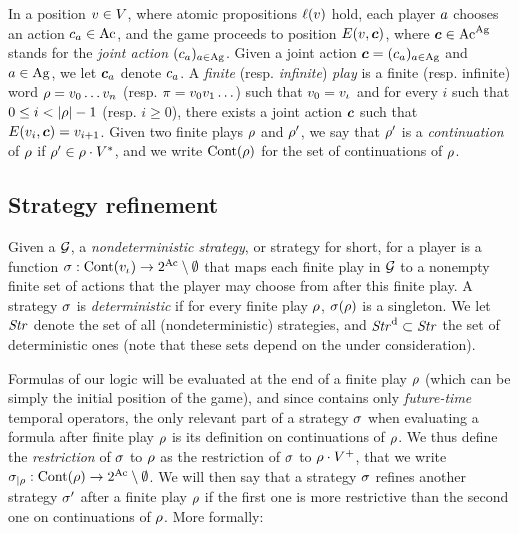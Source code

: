 
In a position $v\in V$, where atomic propositions $\ell(v)$
hold, each player $a$ chooses an action $c_a\in\textnormal{Ac}$, 
and the game proceeds to position
$E(v, \bm{c})$, where $\bm{c}\in \textnormal{Ac}^{\textnormal{Ag}}$ stands for the \emph{joint action}
$(c_a)_{a\in\textnormal{Ag}}$. Given a joint action
$\bm{c}=(c_a)_{a\in\textnormal{Ag}}$ and $a\in\textnormal{Ag}$, we let
$\bm{c}_{a}$ denote $c_a$.
A \emph{finite} (resp. \emph{infinite}) \emph{play} is a finite (resp. infinite)
word $\rho=v_{0}\ldots v_{n}$ (resp. $\pi=v_{0} v_{1}\ldots$)
such that $v_0=v_{\iota}$ and for every $i$ such that $0\leq i<|\fplay|-1$ (resp. $i\geq 0$), there exists a joint action $\bm{c}$
such that $E(v_{i}, \bm{c})=v_{i+1}$.
Given two finite plays $\rho$ and $\rho'$, we say that $\rho'$
is a \emph{continuation} of $\rho$ if $\rho'\in\rho\cdot
V^*$, and we write $\text{Cont}(\rho)$ for the set of
continuations of $\rho$.


\subsection{Strategy refinement}
\label{sec-ndstrat}
Given a \CGS $\CGS$, a \emph{nondeterministic strategy}, or strategy
for short, for a player is a
function $\sigma:\text{Cont}(v_{\iota})\to 2^{\textnormal{Ac}}\setminus\emptyset$
that maps each finite play in $\CGS$ to a nonempty finite set of
actions that the player may choose from after this finite play.  A strategy $\sigma$ is
\emph{deterministic} if for every finite play $\rho$,
$\sigma(\rho)$ is a singleton.  We let $\mbox{\emph{Str}}$ denote the set of
all (nondeterministic) strategies, and $\mbox{\emph{Str}}^{\text{d}}\subset\mbox{\emph{Str}}$
the set of deterministic ones (note that these sets depend on the \CGS
under consideration).

Formulas of our logic \SLref will be evaluated at the end of a finite play
$\rho$ (which can be simply the initial position of the game), and
since \SLref contains only \emph{future-time} temporal operators,
the only relevant part of a strategy $\sigma$ when evaluating  a
formula after finite play $\rho$ is its definition on continuations
of $\rho$. We thus define the \emph{restriction} of $\sigma$ to
$\rho$ as the restriction of $\sigma$ to $\rho\cdot V^+$, that we
write ${\sigma}_{|\rho}:\text{Cont}(\rho)\to 2^{\textnormal{Ac}}\setminus\emptyset$.
We will then say that a strategy $\sigma$ refines another strategy
$\sigma'$ after a finite play $\rho$ if the first one is more
restrictive than the second one on continuations of $\rho$. More formally:

